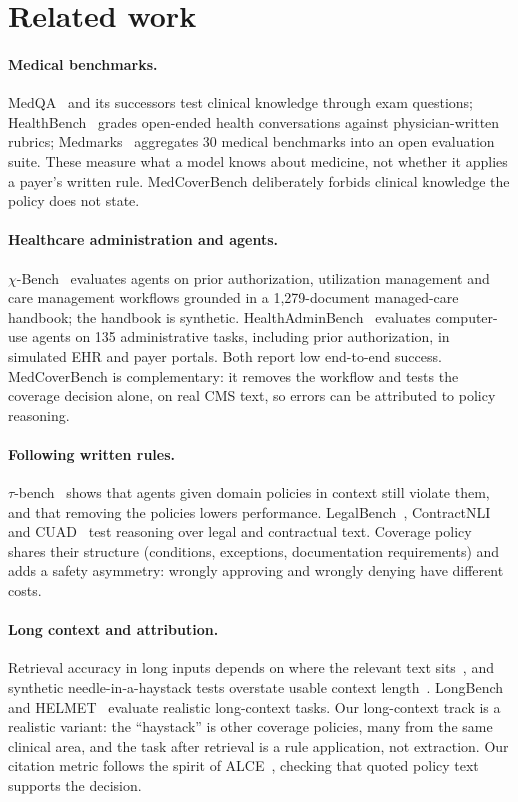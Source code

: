 \documentclass[11pt]{article}
\begin{document}
\section{Related work}

\paragraph{Medical benchmarks.} MedQA~\citep{jin2021medqa} and its successors test clinical
knowledge through exam questions; HealthBench~\citep{arora2025healthbench} grades open-ended
health conversations against physician-written rubrics; Medmarks~\citep{warner2026medmarks}
aggregates 30 medical benchmarks into an open evaluation suite. These measure what a model knows
about medicine, not whether it applies a payer's written rule. MedCoverBench deliberately forbids
clinical knowledge the policy does not state.

\paragraph{Healthcare administration and agents.} $\chi$-Bench~\citep{chen2026chibench} evaluates
agents on prior authorization, utilization management and care management workflows grounded in a
1,279-document managed-care handbook; the handbook is synthetic. HealthAdminBench~\citep{bedi2026healthadminbench}
evaluates computer-use agents on 135 administrative tasks, including prior authorization, in
simulated EHR and payer portals. Both report low end-to-end success. MedCoverBench is
complementary: it removes the workflow and tests the coverage decision alone, on real CMS text,
so errors can be attributed to policy reasoning.

\paragraph{Following written rules.} $\tau$-bench~\citep{yao2024taubench} shows that agents given
domain policies in context still violate them, and that removing the policies lowers performance.
LegalBench~\citep{guha2023legalbench}, ContractNLI~\citep{koreeda2021contractnli} and
CUAD~\citep{hendrycks2021cuad} test reasoning over legal and contractual text. Coverage policy
shares their structure (conditions, exceptions, documentation requirements) and adds a safety
asymmetry: wrongly approving and wrongly denying have different costs.

\paragraph{Long context and attribution.} Retrieval accuracy in long inputs depends on where the
relevant text sits~\citep{liu2024lost}, and synthetic needle-in-a-haystack tests overstate usable
context length~\citep{hsieh2024ruler,yen2025helmet}. LongBench~\citep{bai2024longbench} and
HELMET~\citep{yen2025helmet} evaluate realistic long-context tasks. Our long-context track is a
realistic variant: the ``haystack'' is other coverage policies, many from the same clinical area,
and the task after retrieval is a rule application, not extraction. Our citation metric follows
the spirit of ALCE~\citep{gao2023alce}, checking that quoted policy text supports the decision.
\end{document}
